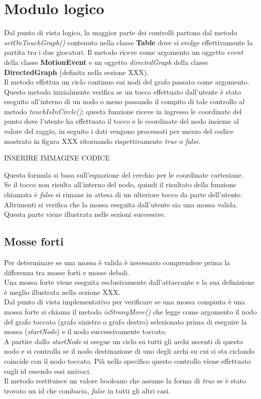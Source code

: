 \documentclass[a4paper,11pt,twoside,openright]{report}
\begin{document}
\section{Modulo logico}
Dal punto di vista logico, la maggior parte dei controlli partono dal metodo \textit{setOnTouchGraph()} contenuto nella classe \textbf{Table} dove si svolge effettivamente la partita tra i due giocatori. Il metodo riceve come argomento un oggetto \textit{event} della classe \textbf{MotionEvent} e un oggetto \textit{directedGraph} della classe \textbf{DirectedGraph} (definita nella sezione XXX).\\
Il metodo effettua un ciclo continuo sui nodi del grafo passato come argomento.\\
Questo metodo inizialmente verifica se un tocco effettuato dall'utente è stato eseguito all'interno di un nodo o meno passando il compito di tale controllo al metodo \textit{touchIsInCircle()}; questa funzione riceve in ingresso le coordinate del punto dove l'utente ha effettuato il tocco e le coordinate del nodo insieme al valore del raggio, in seguito i dati vengono processati per mezzo del codice mostrato in figura XXX ritornando rispettivamente \textit{true} o \textit{false}.

INSERIRE IMMAGINE CODICE

Questa formula si basa sull'equazione del cerchio per le coordinate cartesiane.\\
Se il tocco non risulta all'interno del nodo, quindi il risultato della funzione chiamata è \textit{false} si rimane in attesa di un ulteriore tocco da parte dell'utente.\\
Altrimenti si verifica che la mossa eseguita dall'utente sia una mossa valida. Questa parte viene illustrata nelle sezioni successive.

\subsection{Mosse forti}
Per determinare se una mossa è valida è necessario comprendere prima la differenza tra mosse forti e mosse deboli.\\
Una mossa forte viene eseguita esclusivamente dall'attaccante e la sua definizione è meglio illustrata nella sezione XXX.\\
Dal punto di vista implementativo per verificare se una mossa compiuta è una mossa forte si chiama il metodo \textit{isStrongMove()} che legge come argomento il nodo del grafo toccato (grafo sinistro o grafo destro) selezionato prima di eseguire la mossa (\textit{startNode}) e il nodo successivamente toccato.\\
A partire dallo \textit{startNode} si esegue un ciclo su tutti gli archi uscenti di questo nodo e si controlla se il nodo destinazione di uno degli archi su cui si sta ciclando coincide con il nodo toccato. Più nello specifico questo controllo viene effettuato sugli id essendo essi univoci.\\ 
Il metodo restituisce un valore booleano che assume la forma di \textit{true} se è stato trovato un id che combacia, \textit{false} in tutti gli altri casi.
\end{document}
